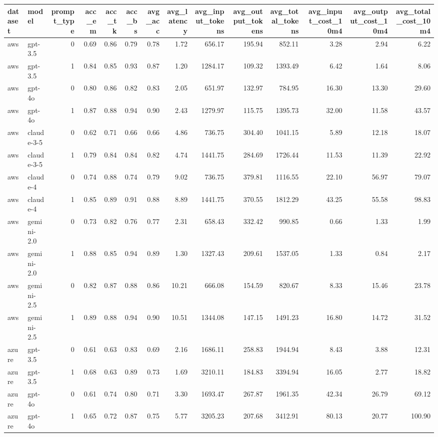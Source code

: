 \begin{tabular}{llrrrrrrrrrrrr}
\toprule
dataset & model & prompt_type & acc_em & acc_tk & acc_bs & avg_acc & avg_latency & avg_input_tokens & avg_output_tokens & avg_total_tokens & avg_input_cost_10m4 & avg_output_cost_10m4 & avg_total_cost_10m4 \\
\midrule
aws & gpt-3.5 & 0 & 0.69 & 0.86 & 0.79 & 0.78 & 1.72 & 656.17 & 195.94 & 852.11 & 3.28 & 2.94 & 6.22 \\
aws & gpt-3.5 & 1 & 0.84 & 0.85 & 0.93 & 0.87 & 1.20 & 1284.17 & 109.32 & 1393.49 & 6.42 & 1.64 & 8.06 \\
aws & gpt-4o & 0 & 0.80 & 0.86 & 0.82 & 0.83 & 2.05 & 651.97 & 132.97 & 784.95 & 16.30 & 13.30 & 29.60 \\
aws & gpt-4o & 1 & 0.87 & 0.88 & 0.94 & 0.90 & 2.43 & 1279.97 & 115.75 & 1395.73 & 32.00 & 11.58 & 43.57 \\
aws & claude-3-5 & 0 & 0.62 & 0.71 & 0.66 & 0.66 & 4.86 & 736.75 & 304.40 & 1041.15 & 5.89 & 12.18 & 18.07 \\
aws & claude-3-5 & 1 & 0.79 & 0.84 & 0.84 & 0.82 & 4.74 & 1441.75 & 284.69 & 1726.44 & 11.53 & 11.39 & 22.92 \\
aws & claude-4 & 0 & 0.74 & 0.88 & 0.74 & 0.79 & 9.02 & 736.75 & 379.81 & 1116.55 & 22.10 & 56.97 & 79.07 \\
aws & claude-4 & 1 & 0.85 & 0.89 & 0.91 & 0.88 & 8.89 & 1441.75 & 370.55 & 1812.29 & 43.25 & 55.58 & 98.83 \\
aws & gemini-2.0 & 0 & 0.73 & 0.82 & 0.76 & 0.77 & 2.31 & 658.43 & 332.42 & 990.85 & 0.66 & 1.33 & 1.99 \\
aws & gemini-2.0 & 1 & 0.88 & 0.85 & 0.94 & 0.89 & 1.30 & 1327.43 & 209.61 & 1537.05 & 1.33 & 0.84 & 2.17 \\
aws & gemini-2.5 & 0 & 0.82 & 0.87 & 0.88 & 0.86 & 10.21 & 666.08 & 154.59 & 820.67 & 8.33 & 15.46 & 23.78 \\
aws & gemini-2.5 & 1 & 0.89 & 0.88 & 0.94 & 0.90 & 10.51 & 1344.08 & 147.15 & 1491.23 & 16.80 & 14.72 & 31.52 \\
azure & gpt-3.5 & 0 & 0.61 & 0.63 & 0.83 & 0.69 & 2.16 & 1686.11 & 258.83 & 1944.94 & 8.43 & 3.88 & 12.31 \\
azure & gpt-3.5 & 1 & 0.68 & 0.63 & 0.89 & 0.73 & 1.69 & 3210.11 & 184.83 & 3394.94 & 16.05 & 2.77 & 18.82 \\
azure & gpt-4o & 0 & 0.61 & 0.74 & 0.80 & 0.71 & 3.30 & 1693.47 & 267.87 & 1961.35 & 42.34 & 26.79 & 69.12 \\
azure & gpt-4o & 1 & 0.65 & 0.72 & 0.87 & 0.75 & 5.77 & 3205.23 & 207.68 & 3412.91 & 80.13 & 20.77 & 100.90 \\

\end{tabular}
